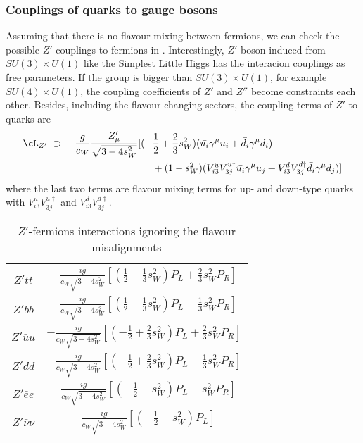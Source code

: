 \subsubsection*{Couplings of quarks to gauge bosons } 
Assuming that there is no flavour mixing between fermions, we can check the possible $Z'$ couplings to fermions in .
Interestingly, $Z'$ boson induced from $SU(3)\times U(1)$ like the Simplest Little Higgs has the interacion couplings as free parameters.  
If the group is bigger than $SU(3)\times U(1)$, for example $SU(4)\times U(1)$, the coupling coefficients of $Z'$ and $Z''$ become constraints each other.
Besides, including the flavour changing sectors, the coupling terms of $Z'$ to quarks are
\begin{align}
 \cL_{Z'}~\supset~ -\frac{g}{c_W}\frac{Z_\mu'}{\sqrt{3-4s_W^2}}\huge[ (-&\frac{1}{2}+\frac{2}{3}s_W^2)(\bar{u_i}\gamma^\mu u_i  + \bar{d_i}\gamma^\mu d_i) \nonumber \\
 &+ (1-s_W^2)(V_{i3}^u V_{3j}^{u\dagger}\bar{u_i}\gamma^\mu u_j + V_{i3}^d V_{3j}^{d\dagger}\bar{d_i}\gamma^\mu d_j) \huge] 
\end{align}
where the last two terms are flavour mixing terms for up- and down-type quarks with $V_{i3}^u V_{3j}^{u\dagger}$ and $V_{i3}^d V_{3j}^{d\dagger}$.

\begin{table} %
\begin{center}
  \begin{tabular}{| c | c |}
    \hline
    $Z'\bar{t}t$ &$-\frac{ig}{c_W\sqrt{3-4s_W^2}}[(\frac{1}{2}-\frac{1}{3}s_W^2) P_L + \frac{2}{3}s_W^2P_R]$ \\[5pt] \hline
    $Z'\bar{b}b$ &$-\frac{ig}{c_W\sqrt{3-4s_W^2}}[(\frac{1}{2}-\frac{1}{3}s_W^2) P_L - \frac{1}{3}s_W^2P_R]$  \\[5pt] \hline
    $Z'\bar{u}u$ &$-\frac{ig}{c_W\sqrt{3-4s_W^2}}[(-\frac{1}{2}+\frac{2}{3}s_W^2) P_L + \frac{2}{3}s_W^2P_R]$  \\[5pt] \hline
    $Z'\bar{d}d$ &$-\frac{ig}{c_W\sqrt{3-4s_W^2}}[(-\frac{1}{2}+\frac{2}{3}s_W^2) P_L - \frac{1}{3}s_W^2P_R]$  \\[5pt] \hline
    $Z'\bar{e}e$ &$-\frac{ig}{c_W\sqrt{3-4s_W^2}}[(-\frac{1}{2}-s_W^2) P_L - s_W^2P_R]$  \\[5pt] \hline    
    $Z'\bar{\nu}\nu$ &$-\frac{ig}{c_W\sqrt{3-4s_W^2}}[(-\frac{1}{2}-s_W^2) P_L ]$  \\[5pt] \hline    
  \end{tabular}
  \caption{$Z'$-fermions interactions ignoring the flavour misalignments}
  \label{tab:Zff}
\end{center}
 \end{table}
        



